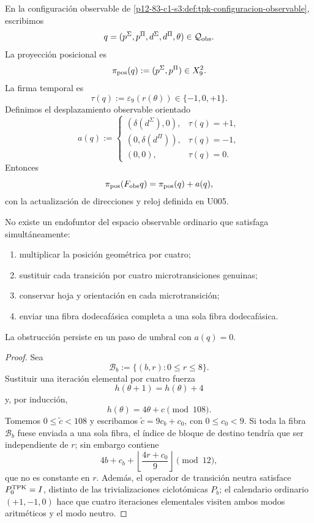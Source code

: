 En la configuración observable de
\cref{p12-83-c1-s3:def:tpk-configuracion-observable}, escribimos
\[
 q=(p^\Sigma,p^\Pi,d^\Sigma,d^\Pi,\theta)
 \in\mathcal Q_{\rm obs}.
\]
La proyección posicional es
\begin{equation}
 \pi_{\rm pos}(q):=(p^\Sigma,p^\Pi)\in X_9^2.
 \label{p12-83-c1-s12:eq:u006c-proyeccion-posicional}
\end{equation}
La firma temporal es
\[
 \tau(q):=\varepsilon_9(r(\theta))\in\{-1,0,+1\}.
\]
Definimos el desplazamiento observable orientado
\begin{equation}
 a(q):=
 \begin{cases}
  (\delta(d^\Sigma),0),&\tau(q)=+1,\\
  (0,\delta(d^\Pi)),&\tau(q)=-1,\\
  (0,0),&\tau(q)=0.
 \end{cases}
 \label{p12-83-c1-s12:eq:u006c-desplazamiento-observable}
\end{equation}
Entonces
\[
 \pi_{\rm pos}(F_{\rm obs}q)=\pi_{\rm pos}(q)+a(q),
\]
con la actualización de direcciones y reloj definida en U005.

\begin{theorem}
\label{p12-83-c1-s12:thm:u006c-obstruccion}
No existe un endofuntor del espacio observable ordinario que satisfaga
simultáneamente:
\begin{enumerate}
 \item multiplicar la posición geométrica por cuatro;
 \item sustituir cada transición por cuatro microtransiciones genuinas;
 \item conservar hoja y orientación en cada microtransición;
 \item enviar una fibra dodecafásica completa a una sola fibra
 dodecafásica.
\end{enumerate}
La obstrucción persiste en un paso de umbral con \(a(q)=0\).
\end{theorem}

\begin{proof}
Sea
\[
 \mathcal B_b:=\{(b,r):0\leq r\leq8\}.
\]
Sustituir una iteración elemental por cuatro fuerza
\[
 h(\theta+1)=h(\theta)+4
\]
y, por inducción,
\[
 h(\theta)=4\theta+c\pmod{108}.
\]
Tomemos \(0\leq\widetilde c<108\) y escribamos
\(\widetilde c=9c_b+c_0\), con \(0\leq c_0<9\). Si toda la fibra
\(\mathcal B_b\) fuese enviada a una sola fibra, el índice de bloque de
destino tendría que ser independiente de \(r\); sin embargo contiene
\begin{equation}
 4b+c_b+
 \left\lfloor\frac{4r+c_0}{9}\right\rfloor
 \pmod{12},
 \label{p12-83-c1-s12:eq:u006c-bloque-obstruccion}
\end{equation}
que no es constante en \(r\). Además, el operador de transición neutra
satisface \(P_0^{\rm TPK}=I\), distinto de las trivializaciones
ciclotómicas \(P_b\); el calendario ordinario \((+1,-1,0)\) hace que
cuatro iteraciones elementales visiten ambos modos aritméticos y el modo
neutro.
\end{proof}

